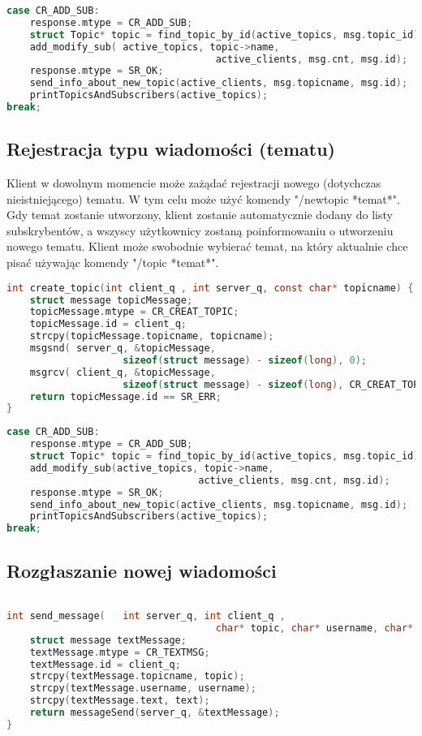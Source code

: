 \documentclass{article}
\begin{document}
	\begin{lstlisting}[language=c,
		numbersep=5pt,
		tabsize=2,
		showstringspaces=false]
case CR_ADD_SUB:
	response.mtype = CR_ADD_SUB;
	struct Topic* topic = find_topic_by_id(active_topics, msg.topic_id);
	add_modify_sub(	active_topics, topic->name, 
									active_clients, msg.cnt, msg.id);
	response.mtype = SR_OK;
	send_info_about_new_topic(active_clients, msg.topicname, msg.id);
	printTopicsAndSubscribers(active_topics);
break;
	\end{lstlisting}
	\subsection{Rejestracja typu wiadomości (tematu)}
	Klient w dowolnym momencie może zażądać rejestracji nowego (dotychczas nieistniejącego) tematu. W tym celu może użyć komendy "/newtopic *temat*". Gdy temat zostanie utworzony, klient zostanie automatycznie dodany do listy subskrybentów, a wszyscy użytkownicy zostaną poinformowaniu o utworzeniu nowego tematu. Klient może swobodnie wybierać temat, na który aktualnie chce pisać używając komendy "/topic *temat*".
	\begin{lstlisting}[language=c,
		numbersep=5pt,
		tabsize=2,
		showstringspaces=false]
int create_topic(int client_q , int server_q, const char* topicname) {
	struct message topicMessage;
	topicMessage.mtype = CR_CREAT_TOPIC;
	topicMessage.id = client_q;
	strcpy(topicMessage.topicname, topicname);
	msgsnd(	server_q, &topicMessage, 
					sizeof(struct message) - sizeof(long), 0);
	msgrcv(	client_q, &topicMessage, 
					sizeof(struct message) - sizeof(long), CR_CREAT_TOPIC, 0);
	return topicMessage.id == SR_ERR;
}
	\end{lstlisting}

	\begin{lstlisting}[language=c,
		numbersep=5pt,
		tabsize=2,
		showstringspaces=false]
case CR_ADD_SUB:
	response.mtype = CR_ADD_SUB;
	struct Topic* topic = find_topic_by_id(active_topics, msg.topic_id);
	add_modify_sub(active_topics, topic->name,
								 active_clients, msg.cnt, msg.id);
	response.mtype = SR_OK;
	send_info_about_new_topic(active_clients, msg.topicname, msg.id);
	printTopicsAndSubscribers(active_topics);
break;
	\end{lstlisting}
	\subsection{Rozgłaszanie nowej wiadomości}
	\begin{lstlisting}[language=c,
		numbersep=5pt,
		tabsize=2,
		showstringspaces=false]

int send_message(	int server_q, int client_q , 
									char* topic, char* username, char* text) {
	struct message textMessage;
	textMessage.mtype = CR_TEXTMSG;
	textMessage.id = client_q;
	strcpy(textMessage.topicname, topic);
	strcpy(textMessage.username, username);
	strcpy(textMessage.text, text);
	return messageSend(server_q, &textMessage);
}
	\end{lstlisting}
\end{document}
